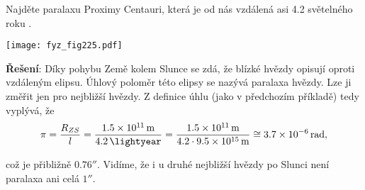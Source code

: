 \wikitextrule
\begin{example}\label{FYZ:exam006}
  Najděte paralaxu Proximy Centauri, která je od nás vzdálená asi \num{4.2} světelného roku 
  \cite[s.~4]{Kulhanek2009}.
  
   {\centering
    \captionsetup{type=figure}
    \texttt{[image: fyz\_fig225.pdf]}
    \label{fyz:fig225}
    \par}
    
  \textbf{Řešení}: Díky pohybu Země kolem Slunce se zdá, že blízké hvězdy opisují oproti 
  vzdáleným elipsu. Úhlový poloměr této elipsy se nazývá paralaxa hvězdy. Lze ji změřit jen pro 
  nejbližší hvězdy. Z definice úhlu (jako v předchozím příkladě) tedy vyplývá, že
  \begin{equation*}
    \pi = \frac{R_{ZS}}{l} = \frac{\SI{1.5e11}{\meter}}{\SI{4.2}{\lightyear}} 
        = \frac{\SI{1.5e11}{\meter}}{\num{4,2}\cdot\SI{9.5e15}{\meter}}
          \cong \SI{3,7e-6}{\radian},
  \end{equation*}
  
  což je přibližně \(\ang{;;0,76}\). Vidíme, že i u druhé nejbližší hvězdy po Slunci není 
  paralaxa ani celá \(\ang{;;1}\).
\end{example}
\wikitextrule